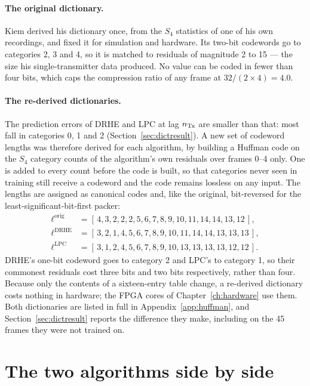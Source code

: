 \paragraph{The original dictionary.} Kiem derived his dictionary once, from
the $S_4$ statistics of one of his own recordings, and fixed it for simulation
and hardware. Its two-bit codewords go to categories 2, 3 and 4, so it is
matched to residuals of magnitude 2 to 15 --- the size his single-transmitter
data produced. No value can be coded in fewer than four bits, which caps the
compression ratio of any frame at $32/(2 \times 4) = 4.0$.

\paragraph{The re-derived dictionaries.} The prediction errors of DRHE and
LPC at lag $n_{\mathrm{Tx}}$ are smaller than that: most fall in categories 0, 1 and 2
(Section~\ref{sec:dictresult}). A new set of codeword lengths was therefore
derived for each algorithm, by building a Huffman code \cite{huffman1952} on
the $S_4$ category counts of the algorithm's own residuals over frames 0--4
only. One is added to every count before the code is built, so that categories
never seen in training still receive a codeword and the code remains lossless
on any input. The lengths are assigned as canonical codes and, like the
original, bit-reversed for the least-significant-bit-first packer:
\begin{align*}
\ell^{\mathrm{orig}} &= [\,4,3,2,2,2,5,6,7,8,9,10,11,14,14,13,12\,],\\
\ell^{\mathrm{DRHE}} &= [\,3,2,1,4,5,6,7,8,9,10,11,14,14,13,13,13\,],\\
\ell^{\mathrm{LPC}}  &= [\,3,1,2,4,5,6,7,8,9,10,13,13,13,13,12,12\,].
\end{align*}
DRHE's one-bit codeword goes to category 2 and LPC's to category 1, so their
commonest residuals cost three bits and two bits respectively, rather than
four. Because only the
contents of a sixteen-entry table change, a re-derived dictionary costs nothing
in hardware; the FPGA cores of Chapter~\ref{ch:hardware} use them. Both
dictionaries are listed in full in Appendix~\ref{app:huffman}, and
Section~\ref{sec:dictresult} reports the difference they make, including on the
45 frames they were not trained on.

\section{The two algorithms side by side}


